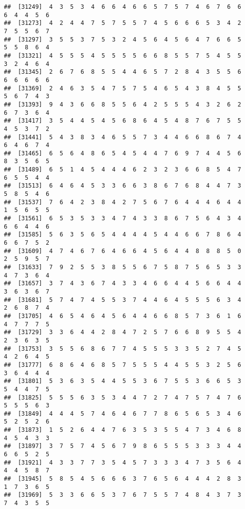 \documentclass[
]{book}
\begin{document}
\begin{verbatim}
##  [31249]  4  3  5  3  4  6  6  4  6  6  5  7  5  7  4  6  7  6  6  6  4  4  5  6
##  [31273]  4  2  4  4  7  5  7  5  5  7  4  5  6  6  6  5  3  4  2  7  5  5  6  7
##  [31297]  3  5  5  3  7  5  3  2  4  5  6  4  5  6  4  7  6  6  5  5  5  8  6  4
##  [31321]  4  5  5  5  4  5  5  5  5  6  6  8  5  5  7  5  4  5  5  3  2  4  6  4
##  [31345]  2  6  7  6  8  5  5  4  4  6  5  7  2  8  4  3  5  5  6  6  6  6  6  6
##  [31369]  2  4  6  3  5  4  7  5  7  5  4  6  5  4  3  8  4  5  5  5  6  7  4  3
##  [31393]  9  4  3  6  6  8  5  5  6  4  2  5  5  5  4  3  2  6  2  6  7  3  6  4
##  [31417]  3  5  4  4  5  4  5  6  8  6  4  5  4  8  7  6  7  5  5  4  5  3  7  2
##  [31441]  5  4  3  8  3  4  6  5  5  7  3  4  4  6  6  8  6  7  4  6  4  6  7  4
##  [31465]  6  5  6  4  8  6  5  4  5  4  4  7  6  9  7  4  4  5  6  8  3  5  6  5
##  [31489]  6  5  1  4  5  4  4  4  6  2  3  2  3  6  6  8  5  4  7  6  5  5  4  4
##  [31513]  6  4  6  4  5  3  3  6  6  3  8  6  7  6  8  4  4  7  3  5  8  5  4  6
##  [31537]  7  6  4  2  3  8  4  2  7  5  6  7  6  4  4  4  6  4  4  1  5  6  5  5
##  [31561]  6  5  3  5  3  3  4  7  4  3  3  8  6  7  5  6  4  3  4  6  6  4  4  6
##  [31585]  5  6  3  5  6  5  4  4  4  4  5  4  4  6  6  7  8  6  4  6  6  7  5  2
##  [31609]  4  7  4  6  7  6  4  6  6  4  5  6  4  4  8  8  8  5  0  2  5  9  5  7
##  [31633]  7  9  2  5  5  3  8  5  5  6  7  5  8  7  5  6  5  3  3  4  7  3  6  4
##  [31657]  3  7  4  3  6  7  4  3  3  4  6  6  4  4  5  6  6  4  4  3  6  3  6  7
##  [31681]  5  7  4  7  4  5  5  3  7  4  4  6  4  5  5  5  6  3  4  2  6  8  7  4
##  [31705]  4  6  5  4  6  4  5  6  4  4  6  6  8  5  7  3  6  1  6  4  7  7  7  5
##  [31729]  3  3  6  4  4  2  8  4  7  2  5  7  6  6  8  9  5  5  4  2  3  6  3  5
##  [31753]  3  5  5  6  8  6  7  7  4  5  5  5  3  3  5  2  7  4  5  4  2  6  4  5
##  [31777]  6  8  6  4  6  8  5  7  5  5  5  4  4  5  5  3  2  5  6  3  6  4  4  4
##  [31801]  5  3  6  3  5  4  4  5  5  3  6  7  5  5  3  6  6  5  3  5  4  4  7  5
##  [31825]  5  5  5  6  3  5  3  4  4  7  2  7  4  7  5  7  4  7  6  5  5  5  6  3
##  [31849]  4  4  4  5  7  4  6  4  6  7  7  8  6  5  6  5  3  4  6  5  2  5  2  6
##  [31873]  1  5  2  6  4  4  7  6  3  5  3  5  5  4  7  3  4  6  8  4  5  4  3  3
##  [31897]  3  7  5  7  4  5  6  7  9  8  6  5  5  5  3  3  3  4  4  6  6  5  2  5
##  [31921]  4  3  3  7  7  3  5  4  5  7  3  3  3  4  7  3  5  6  4  4  4  5  8  7
##  [31945]  5  8  5  4  5  6  6  6  3  7  6  5  6  4  4  4  2  8  3  1  7  3  6  5
##  [31969]  5  3  3  6  6  5  3  7  6  7  5  5  7  4  8  4  3  7  3  7  4  3  5  5

\end{verbatim}
\end{document}
